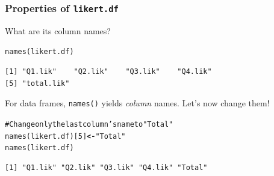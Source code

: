 \documentclass{beamer}\usepackage[]{graphicx}\usepackage[]{color}
\makeatletter
\newcommand{\hlnum}[1]{\textcolor[rgb]{0.533,0,0.133}{#1}}%
\newcommand{\hlstr}[1]{\textcolor[rgb]{0.667,0.267,0}{#1}}%
\newcommand{\hlcom}[1]{\textcolor[rgb]{1,0.533,0}{#1}}%
\newcommand{\hlstd}[1]{\textcolor[rgb]{0,0,0}{#1}}%
\newcommand{\hlkwb}[1]{\textcolor[rgb]{0,0,0.4}{\textbf{#1}}}%
\newcommand{\hlkwd}[1]{\textcolor[rgb]{0,0.267,0.4}{#1}}%
\newenvironment{kframe}{%
 \def\at@end@of@kframe{}%
 \ifinner\ifhmode%
  \def\at@end@of@kframe{\end{minipage}}%
  \begin{minipage}{\columnwidth}%
 \fi\fi%
 \def\FrameCommand##1{\hskip\@totalleftmargin \hskip-\fboxsep
 \colorbox{shadecolor}{##1}\hskip-\fboxsep
     \hskip-\linewidth \hskip-\@totalleftmargin \hskip\columnwidth}%
 \MakeFramed {\advance\hsize-\width
   \@totalleftmargin\z@ \linewidth\hsize
   \@setminipage}}%
 {\par\unskip\endMakeFramed%
 \at@end@of@kframe}
\newenvironment{knitrout}{}{} %
\makeatother
\begin{document}
\begin{frame}[fragile]
\frametitle{Properties of \texttt{likert.df}}
What are its column names?

\vspace{-2mm}
\begin{knitrout}
\color{fgcolor}\begin{kframe}
\begin{alltt}
\hlkwd{names}\hlstd{(likert.df)}
\end{alltt}
\end{kframe}
\end{knitrout}
\vspace{-5mm}
\begin{knitrout}
\color{fgcolor}\begin{kframe}
\begin{verbatim}
[1] "Q1.lik"    "Q2.lik"    "Q3.lik"    "Q4.lik"   
[5] "total.lik"
\end{verbatim}
\end{kframe}
\end{knitrout}
\vspace{-2mm}
For data frames, \texttt{names()} yields {\em column} names. 
Let's now change them!\\
\vspace{-2mm}
\begin{knitrout}
\color{fgcolor}\begin{kframe}
\begin{alltt}
\hlcom{# Change only the last column's name to "Total"}
\hlkwd{names}\hlstd{(likert.df)[}\hlnum{5}\hlstd{]} \hlkwb{<-} \hlstr{"Total"}
\hlkwd{names}\hlstd{(likert.df)}
\end{alltt}
\end{kframe}
\end{knitrout}
\vspace{-5mm}
\begin{knitrout}
\color{fgcolor}\begin{kframe}
\begin{verbatim}
[1] "Q1.lik" "Q2.lik" "Q3.lik" "Q4.lik" "Total" 
\end{verbatim}
\end{kframe}
\end{knitrout}
\vspace{-2mm}
\begin{knitrout}
\color{fgcolor}\begin{kframe}

\end{kframe}
\end{knitrout}
\end{frame}
\end{document}

